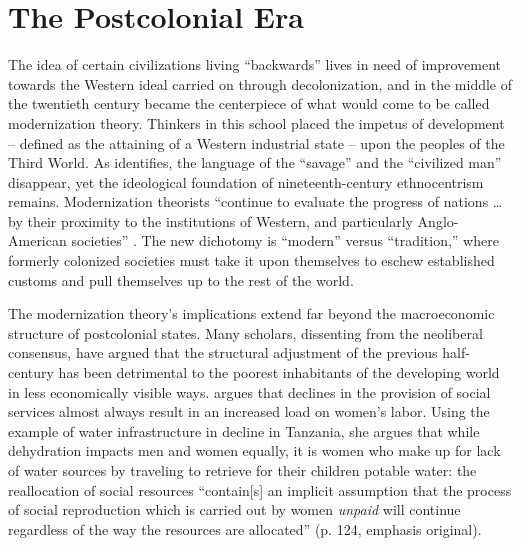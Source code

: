 \documentclass[american]{../../../coursework}
\begin{document}
\section{The Postcolonial Era}

The idea of certain civilizations living ``backwards'' lives in need of
improvement towards the Western ideal carried on through decolonization, and
in the middle of the twentieth century became the centerpiece of what would
come to be called modernization theory. Thinkers in this school placed the
impetus of development -- defined as the attaining of a Western industrial
state -- upon the peoples of the Third World. As \textcite{Tip73} identifies,
the language of the ``savage'' and the ``civilized man'' disappear, yet the
ideological foundation of nineteenth-century ethnocentrism remains.
Modernization theorists ``continue to evaluate the progress of nations \dots
by their proximity to the institutions of Western, and particularly
Anglo-American societies'' \parencite[206]{Tip73}. The new dichotomy is
``modern'' versus ``tradition,'' where formerly colonized societies must take
it upon themselves to eschew established customs and pull themselves up to
the rest of the world.

The modernization theory's implications extend far beyond the macroeconomic
structure of postcolonial states. Many scholars, dissenting from the
neoliberal consensus, have argued that the structural adjustment of the
previous half-century has been detrimental to the poorest inhabitants of the
developing world in less economically visible ways. \textcite{Ear96} argues
that declines in the provision of social services almost always result in an
increased load on women's labor. Using the example of water infrastructure in
decline in Tanzania, she argues that while dehydration impacts men and women
equally, it is women who make up for lack of water sources by traveling to
retrieve for their children potable water: the reallocation of social
resources ``contain[s] an implicit assumption that the process of social
reproduction which is carried out by women \textit{unpaid} will continue
regardless of the way the resources are allocated'' (p. 124, emphasis
original).
\end{document}
